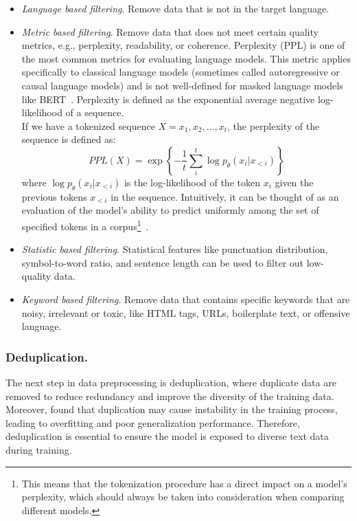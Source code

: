 \begin{itemize}
	\item \textit{Language based filtering}. {Remove data that is not in the target language.}
	\item \textit{Metric based filtering}. {Remove data that does not meet certain quality metrics, e.g., perplexity, readability, or coherence.
	      Perplexity (PPL) is one of the most common metrics for evaluating language models.
	      This metric applies specifically to classical language models (sometimes called autoregressive or causal language models) and is not well-defined for masked language models like BERT~\cite{devlin2019bert}.
	      Perplexity is defined as the exponential average negative log-likelihood of a sequence.\\
	      If we have a tokenized sequence \(X = x_1, x_2, \ldots, x_t\), the perplexity of the sequence is defined as:
	      \begin{equation}
		      PPL(X) = \exp \left\{ -\frac{1}{t} \sum_{i}^{t} \log p_{\theta}(x_i | x_{<i}) \right\}
		      \label{eq:equation_perplexity}
	      \end{equation}
	      where \(\log p_{\theta}(x_i | x_{<i})\) is the log-likelihood of the token \(x_i\) given the previous tokens \(x_{<i}\) in the sequence.
	      Intuitively, it can be thought of as an evaluation of the model's ability to predict uniformly among the set of specified tokens in a corpus\footnote{This means that the tokenization procedure has a direct impact on a model’s perplexity, which should always be taken into consideration when comparing different models.}~\cite{huggingface2023perplexity}.
	      }
	\item \textit{Statistic based filtering}. {Statistical features like punctuation distribution, symbol-to-word ratio, and sentence length can be used to filter out low-quality data.
	      }
	\item \textit{Keyword based filtering}. {Remove data that contains specific keywords that are noisy, irrelevant or toxic, like HTML tags, URLs, boilerplate text, or offensive language.}
\end{itemize}

\subsubsection{Deduplication.}
The next step in data preprocessing is deduplication, where duplicate data are removed to reduce redundancy and improve the diversity of the training data.
Moreover, \textcite{hernandez2022scaling} found that duplication may cause instability in the training process, leading to overfitting and poor generalization performance.
Therefore, deduplication is essential to ensure the model is exposed to diverse text data during training.

